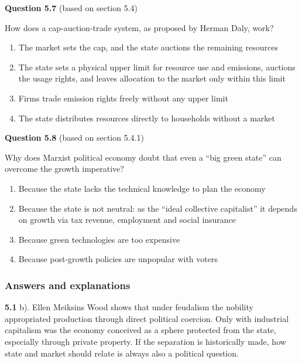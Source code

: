 \documentclass[
  british,
  a4paper,
  DIV=11,
  numbers=noendperiod,
  oneside,
  openany]{scrreprt}
\providecommand{\tightlist}{%
  \setlength{\itemsep}{0pt}\setlength{\parskip}{0pt}}
\begin{document}
\textbf{Question 5.7} (based on section 5.4)

How does a cap-auction-trade system, as proposed by Herman Daly, work?

\begin{enumerate}
\def\labelenumi{\alph{enumi})}
\tightlist
\item
  The market sets the cap, and the state auctions the remaining
  resources
\item
  The state sets a physical upper limit for resource use and emissions,
  auctions the usage rights, and leaves allocation to the market only
  within this limit
\item
  Firms trade emission rights freely without any upper limit
\item
  The state distributes resources directly to households without a
  market
\end{enumerate}

\textbf{Question 5.8} (based on section 5.4.1)

Why does Marxist political economy doubt that even a ``big green state''
can overcome the growth imperative?

\begin{enumerate}
\def\labelenumi{\alph{enumi})}
\tightlist
\item
  Because the state lacks the technical knowledge to plan the economy
\item
  Because the state is not neutral: as the ``ideal collective
  capitalist'' it depends on growth via tax revenue, employment and
  social insurance
\item
  Because green technologies are too expensive
\item
  Because post-growth policies are unpopular with voters
\end{enumerate}

\subsubsection*{Answers and
explanations}\label{answers-and-explanations-4}

\textbf{5.1} b). Ellen Meiksins Wood shows that under feudalism the
nobility appropriated production through direct political coercion. Only
with industrial capitalism was the economy conceived as a sphere
protected from the state, especially through private property. If the
separation is historically made, how state and market should relate is
always also a political question.
\end{document}
